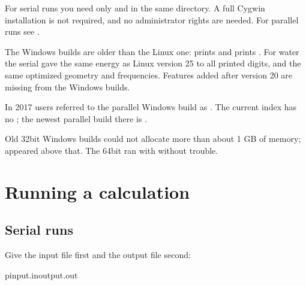 \documentclass[letterpaper,10pt,english,openany,oneside]{sphinxmanual}
\begin{document}
\sphinxAtStartPar
For serial runs you need only  and  in the same directory. A full Cygwin installation is not
required, and no administrator rights are needed. For parallel runs see {\hyperref[\detokenize{start/parallel:running-windows-parallel}]{}}.



\sphinxAtStartPar
The Windows builds are older than the Linux one:  prints  and  prints
. For water the serial  gave the same energy as Linux version 25 to all printed
digits, and the same optimized geometry and frequencies. Features added after version 20 are missing from the
Windows builds.



\sphinxAtStartPar
In 2017 users referred to the parallel Windows build as . The current index has no ; the newest
parallel build there is .



\sphinxAtStartPar
Old 32\sphinxhyphen{}bit Windows builds could not allocate more than about 1 GB of memory;  appeared above that.
The 64\sphinxhyphen{}bit  ran with  without trouble.




\section{Running a calculation}
\label{\detokenize{start/running:running-a-calculation}}

\subsection{Serial runs}
\label{\detokenize{start/running:serial-runs}}
\sphinxAtStartPar
Give the input file first and the output file second:

\begin{sphinxVerbatim}[commandchars=\\\{\}]
pinput.inoutput.out
\end{sphinxVerbatim}
\end{document}
